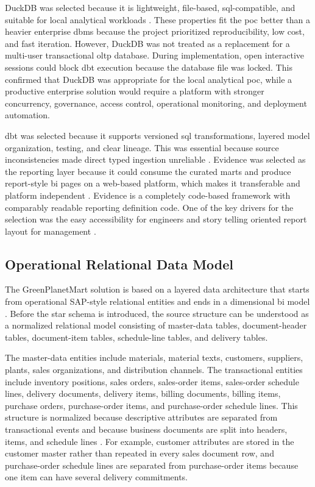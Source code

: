 DuckDB was selected because it is lightweight, file-based, \ac{sql}-compatible, and suitable for local analytical workloads \parencite[1983-1984]{raasveldt_duckdb_2019}. These properties fit the \ac{poc} better than a heavier enterprise \ac{dbms} because the project prioritized reproducibility, low cost, and fast iteration. However, DuckDB was not treated as a replacement for a multi-user transactional \ac{oltp} database. During implementation, open interactive sessions could block \ac{dbt} execution because the database file was locked. This confirmed that DuckDB was appropriate for the local analytical \ac{poc}, while a productive enterprise solution would require a platform with stronger concurrency, governance, access control, operational monitoring, and deployment automation.

\ac{dbt} was selected because it supports versioned \ac{sql} transformations, layered model organization, testing, and clear lineage. This was essential because source inconsistencies made direct typed ingestion unreliable \parencite[]{dbt_labs_llc_dbt_2026}. Evidence was selected as the reporting layer because it could consume the curated marts and produce report-style \ac{bi} pages on a web-based platform, which makes it transferable and platform independent  \parencite[]{evidence_technologies_in_evidence_nodate}. Evidence is a completely code-based framework with comparably readable reporting definition code. One of the key drivers for the selection was the easy accessibility for engineers and story telling oriented report layout for management \parencite[]{li_most_2024}.

\subsection{Operational Relational Data Model}

The GreenPlanetMart solution is based on a layered data architecture that starts from operational SAP-style relational entities and ends in a dimensional \ac{bi} model \parencite[379-381]{codd_relational_1970}. Before the star schema is introduced, the source structure can be understood as a normalized relational model consisting of master-data tables, document-header tables, document-item tables, schedule-line tables, and delivery tables.

The master-data entities include materials, material texts, customers, suppliers, plants, sales organizations, and distribution channels. The transactional entities include inventory positions, sales orders, sales-order items, sales-order schedule lines, delivery documents, delivery items, billing documents, billing items, purchase orders, purchase-order items, and purchase-order schedule lines. This structure is normalized because descriptive attributes are separated from transactional events and because business documents are split into headers, items, and schedule lines \parencite[1]{codd_further_1971}. For example, customer attributes are stored in the customer master rather than repeated in every sales document row, and purchase-order schedule lines are separated from purchase-order items because one item can have several delivery commitments.

